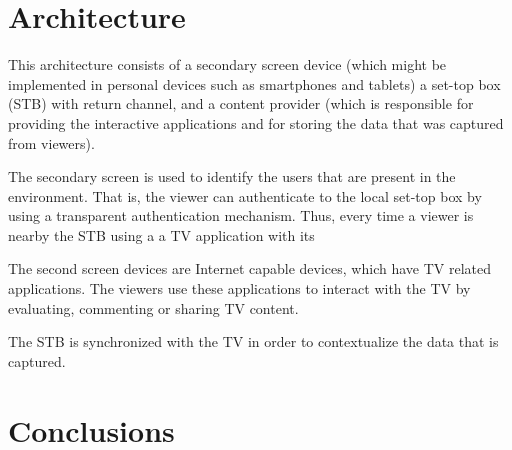 \documentclass[conference,a4paper]{IEEEtran}
\begin{document}
\section{Architecture}

This architecture consists of a secondary screen device (which might be implemented in personal devices such as smartphones and tablets) a set-top box (STB) with return channel, and a content provider (which is responsible for providing the interactive applications and for storing the data that was captured from viewers).

The secondary screen is used to identify the users that are present in the environment. That is, the viewer can authenticate to the local set-top box by using a transparent authentication mechanism. Thus, every time a viewer is nearby the STB using a a TV application with its 

The second screen devices are Internet capable devices, which have TV related applications. The viewers use these applications to interact with the TV by evaluating, commenting or sharing TV content. 

The STB is synchronized with the TV in order to contextualize the data that is captured.
\cite{Lee2010}

\section{Conclusions}





\end{document}
